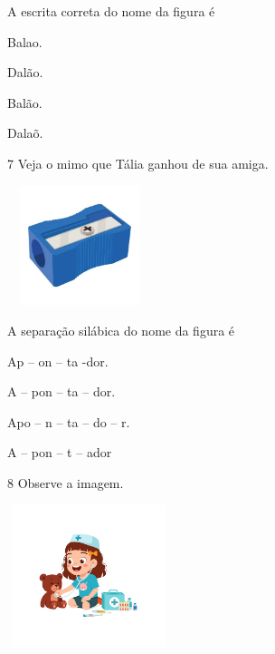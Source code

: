 A escrita correta do nome da figura é

\begin{escolha}
\item Balao.

\item Dalão.

\item Balão.

\item Dalaõ.
\end{escolha}


\num{7} Veja o mimo que Tália ganhou de sua amiga.

\includegraphics[width=1.67273in,height=1.37251in]{media/image168.jpeg}


A separação silábica do nome da figura é

\begin{escolha}
\item Ap -- on -- ta -dor.

\item A -- pon -- ta -- dor.

\item Apo -- n -- ta -- do -- r.

\item A -- pon -- t -- ador
\end{escolha}

\num{8} Observe a imagem.

\includegraphics[width=1.87273in,height=1.62645in]{media/image169.jpeg}

